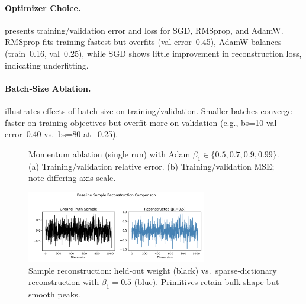 \documentclass{article}
\begin{document}
\paragraph{Optimizer Choice.}
 presents training/validation error and loss for SGD, RMSprop, and AdamW.  RMSprop fits training fastest but overfits (val error~0.45), AdamW balances (train~0.16, val~0.25), while SGD shows little improvement in reconstruction loss, indicating underfitting.

\paragraph{Batch‐Size Ablation.}
 illustrates effects of batch size on training/validation.  Smaller batches converge faster on training objectives but overfit more on validation (e.g., bs=10 val error~0.40 vs.\ bs=80 at ~0.25).

\begin{figure}[h]
  \centering
  \caption{Momentum ablation (single run) with Adam $\beta_1\in\{0.5,0.7,0.9,0.99\}$.  (a) Training/validation relative error.  (b) Training/validation MSE; note differing axis scale.}
\end{figure}

\begin{figure}[h]
  \centering
  \includegraphics[width=0.7\textwidth]{baseline_sample_reconstruction.png}
  \caption{Sample reconstruction: held‐out weight (black) vs.\ sparse‐dictionary reconstruction with $\beta_1=0.5$ (blue).  Primitives retain bulk shape but smooth peaks.}
  \label{fig:recon_sample}
\end{figure}
\end{document}
